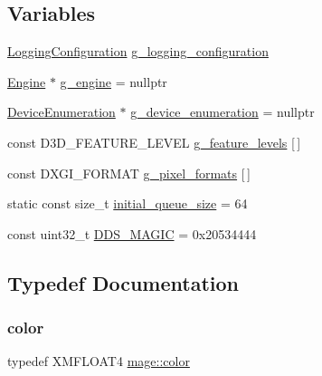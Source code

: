 \subsection*{Variables}
\begin{DoxyCompactItemize}
\item 
\hyperlink{structmage_1_1_logging_configuration}{Logging\+Configuration} \hyperlink{namespacemage_a162413669f92d91c7ee135d60f93fcf1}{g\+\_\+logging\+\_\+configuration}
\item 
\hyperlink{classmage_1_1_engine}{Engine} $\ast$ \hyperlink{namespacemage_a84bf83f1e8779d884452cdf08f56c19a}{g\+\_\+engine} = nullptr
\item 
\hyperlink{classmage_1_1_device_enumeration}{Device\+Enumeration} $\ast$ \hyperlink{namespacemage_a73e54b9b368875ed0281ced59e2fca7e}{g\+\_\+device\+\_\+enumeration} = nullptr
\item 
const D3\+D\+\_\+\+F\+E\+A\+T\+U\+R\+E\+\_\+\+L\+E\+V\+EL \hyperlink{namespacemage_add3b7e051df553262371e077d9d66fd9}{g\+\_\+feature\+\_\+levels} \mbox{[}$\,$\mbox{]}
\item 
const D\+X\+G\+I\+\_\+\+F\+O\+R\+M\+AT \hyperlink{namespacemage_a5a4e11b65061c618b85826ab6df480e0}{g\+\_\+pixel\+\_\+formats} \mbox{[}$\,$\mbox{]}
\item 
static const size\+\_\+t \hyperlink{namespacemage_a64d189167b7098c519fdcefbe4ac058f}{initial\+\_\+queue\+\_\+size} = 64
\item 
const uint32\+\_\+t \hyperlink{namespacemage_a52f784e41b51fee843891c6b5e9be479}{D\+D\+S\+\_\+\+M\+A\+G\+IC} = 0x20534444
\end{DoxyCompactItemize}


\subsection{Typedef Documentation}
\hypertarget{namespacemage_a56eceea5a9bceb2b56073f3ea4945781}{}\label{namespacemage_a56eceea5a9bceb2b56073f3ea4945781} 
\subsubsection{\texorpdfstring{color}{color}}
{\footnotesize\ttfamily typedef X\+M\+F\+L\+O\+A\+T4 \hyperlink{namespacemage_a56eceea5a9bceb2b56073f3ea4945781}{mage\+::color}}

\hypertarget{namespacemage_ae74f374780900893caa5555d1031fd79}{}\label{namespacemage_ae74f374780900893caa5555d1031fd79} 
